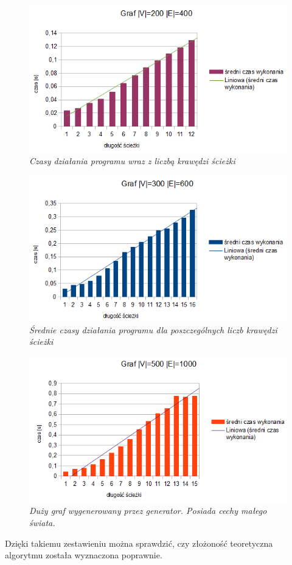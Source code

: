 \documentclass[a4paper, 12pt]{article}
\begin{document}
\begin{figure}[htb]
\centering
\includegraphics[scale=1]{tests/3/wykres.PNG}
\caption{\em Czasy działania programu wraz z liczbą krawędzi ścieżki}
\label{fig:wykres200V}
\end{figure}

\begin{figure}[htb]
\centering
\includegraphics[scale=1]{tests/1/wykres.PNG}
\caption{\em Średnie czasy działania programu dla poszczególnych liczb krawędzi ścieżki}
\label{fig:wykres300V}
\end{figure}

\begin{figure}[htb]
\centering
\includegraphics[scale=1]{tests/2/wykres.PNG}
\caption{\em Duży graf wygenerowany przez generator. Posiada cechy małego świata.}
\label{fig:wykres500V}
\end{figure}
Dzięki takiemu zestawieniu można sprawdzić, czy złożoność teoretyczna algorytmu została wyznaczona poprawnie.
\end{document}
